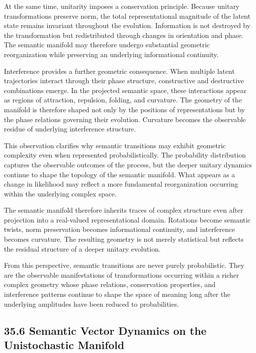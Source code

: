 \documentclass[12pt,letterpaper]{article}
\theoremstyle{remark}
\begin{document}
At the same time, unitarity imposes a conservation principle. Because unitary transformations preserve norm, the total representational magnitude of the latent state remains invariant throughout the evolution. Information is not destroyed by the transformation but redistributed through changes in orientation and phase. The semantic manifold may therefore undergo substantial geometric reorganization while preserving an underlying informational continuity.

Interference provides a further geometric consequence. When multiple latent trajectories interact through their phase structure, constructive and destructive combinations emerge. In the projected semantic space, these interactions appear as regions of attraction, repulsion, folding, and curvature. The geometry of the manifold is therefore shaped not only by the positions of representations but by the phase relations governing their evolution. Curvature becomes the observable residue of underlying interference structure.

This observation clarifies why semantic transitions may exhibit geometric complexity even when represented probabilistically. The probability distribution captures the observable outcomes of the process, but the deeper unitary dynamics continue to shape the topology of the semantic manifold. What appears as a change in likelihood may reflect a more fundamental reorganization occurring within the underlying complex space.

The semantic manifold therefore inherits traces of complex structure even after projection into a real-valued representational domain. Rotations become semantic twists, norm preservation becomes informational continuity, and interference becomes curvature. The resulting geometry is not merely statistical but reflects the residual structure of a deeper unitary evolution.

From this perspective, semantic transitions are never purely probabilistic. They are the observable manifestations of transformations occurring within a richer complex geometry whose phase relations, conservation properties, and interference patterns continue to shape the space of meaning long after the underlying amplitudes have been reduced to probabilities.

\subsection{35.6 Semantic Vector Dynamics on the Unistochastic Manifold}
\end{document}
